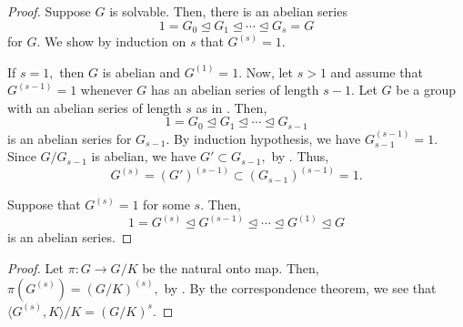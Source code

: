 \solvableifftrivialderiv*\label{prop:solvableifftrivialderiv2}
\begin{flushright}\hyperref[prop:solvableifftrivialderiv]{\upsym}\end{flushright}
\begin{proof}
    \forward Suppose $G$ is solvable. Then, there is an abelian series
    \begin{equation} \label{eq:007}
        1 = G_0 \unlhd G_1 \unlhd \cdots \unlhd G_s = G
    \end{equation}
    for $G.$ We show by induction on $s$ that $G^{(s)} = 1.$ 

    If $s = 1,$ then $G$ is abelian and $G^{(1)} = 1.$ Now, let $s > 1$ and assume that $G^{(s - 1)} = 1$ whenever $G$ has an abelian series of length $s - 1.$ Let $G$ be a group with an abelian series of length $s$ as in . Then,
    \begin{equation*} 
        1 = G_0 \unlhd G_1 \unlhd \cdots \unlhd G_{s - 1}
    \end{equation*}
    is an abelian series for $G_{s - 1}.$ By induction hypothesis, we have $G_{s - 1}^{(s - 1)} = 1.$ Since $G/G_{s - 1}$ is abelian, we have $G' \subset G_{s - 1},$ by . Thus,
    \begin{equation*} 
        G^{(s)} = (G')^{(s - 1)} \subset (G_{s - 1})^{(s - 1)} = 1.
    \end{equation*}

    \backward Suppose that $G^{(s)} = 1$ for some $s.$ Then,
    \begin{equation*} 
        1 = G^{(s)} \unlhd G^{(s - 1)} \unlhd \cdots \unlhd G^{(1)} \unlhd G
    \end{equation*}
    is an abelian series.
\end{proof}

\deriveofquotient*\label{prop:deriveofquotient2}
\begin{flushright}\hyperref[prop:deriveofquotient]{\upsym}\end{flushright}
\begin{proof}
    Let $\pi : G \to G/K$ be the natural onto map. Then, $\pi(G^{(s)}) = (G/K)^{(s)},$ by . By the correspondence theorem, we see that $\langle G^{(s)}, K\rangle/K = (G/K)^{s}.$ 
\end{proof}

